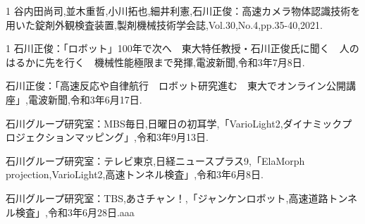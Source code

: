 \begin{発表}{1}
谷内田尚司,並木重哲,小川拓也,細井利憲,石川正俊：高速カメラ物体認識技術を用いた錠剤外観検査装置,製剤機械技術学会誌,Vol.30,No.4,pp.35-40,2021.

\end{発表}

\begin{報道}{1}
石川正俊：「ロボット」100年で次へ　東大特任教授・石川正俊氏に聞く　人のはるかに先を行く　機械性能極限まで発揮,電波新聞,令和3年7月8日.

石川正俊：「高速反応や自律航行　ロボット研究進む　東大でオンライン公開講座」,電波新聞,令和3年6月17日.

石川グループ研究室：MBS毎日,日曜日の初耳学,「VarioLight2,ダイナミックプロジェクションマッピング」,令和3年9月13日.

石川グループ研究室：テレビ東京,日経ニュースプラス9,「ElaMorph projection,VarioLight2,高速トンネル検査」,令和3年6月8日.

石川グループ研究室：TBS,あさチャン！,「ジャンケンロボット,高速道路トンネル検査」,令和3年6月28日.aaa

\end{報道}






